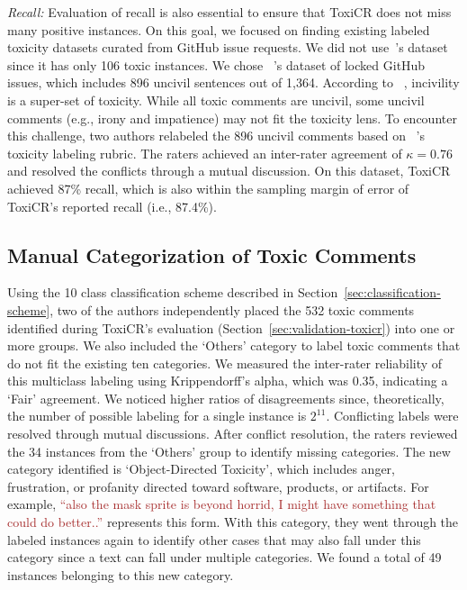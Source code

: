 \emph{Recall:}
Evaluation of recall is also essential to ensure that ToxiCR does not miss many positive instances. On this goal, we focused on finding existing labeled toxicity datasets curated from GitHub issue requests.   
We did not use~\citet{raman2020stress}'s dataset since it has only 106 toxic instances.
We chose ~\citet{ferreira2022heated}'s dataset of locked GitHub issues, which includes 896 uncivil sentences out of 1,364.  According to ~\citet{ferreira2021shut}, incivility is a super-set of toxicity. While all toxic comments are uncivil, some uncivil comments (e.g., irony and impatience) may not fit the toxicity lens. To encounter this challenge, two authors relabeled the 896 uncivil comments based on ~\citet{sarker2022automated}'s toxicity labeling rubric. The raters achieved an inter-rater agreement of $\kappa=0.76$ and resolved the conflicts through a mutual discussion. On this dataset, ToxiCR achieved 87\% recall, which is also within the sampling margin of error of ToxiCR's reported recall (i.e., 87.4\%).





\subsection{Manual Categorization of Toxic Comments}
\label{sec:manual}
Using the 10 class classification scheme described in Section~\ref{sec:classification-scheme}, two of the authors independently placed the 532 toxic comments identified during ToxiCR's evaluation (Section~\ref{sec:validation-toxicr}) into one or more groups. We also included the `Others' category to label toxic comments that do not fit the existing ten categories. We measured the inter-rater reliability of this multiclass labeling using Krippendorff's alpha, which was 0.35, indicating a `Fair' agreement. We noticed higher ratios of disagreements since, theoretically, the number of possible labeling for a single instance is $2^{11}$. Conflicting labels were resolved through mutual discussions.
After conflict resolution, the raters reviewed the 34 instances from the `Others' group to identify missing categories. The new category identified is `Object-Directed Toxicity', which includes anger, frustration, or profanity directed toward software, products, or artifacts. 
For example, \textcolor{brown}{``also the mask sprite is beyond horrid, I might have something that could do better..''} represents this form.
With this category, they went through the labeled instances again to identify other cases that may also fall under this category since a text can fall under multiple categories. We found a total of 49 instances belonging to this new category.




